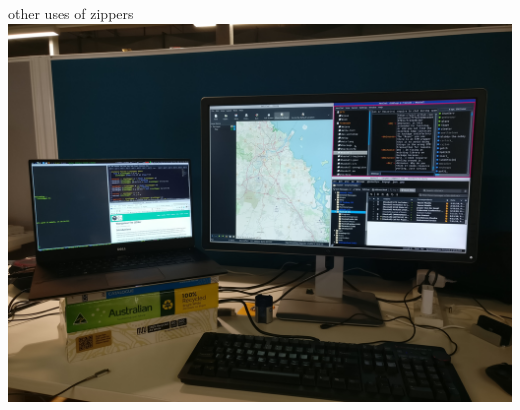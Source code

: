 
\begin{frame}
\begin{block}{other uses of zippers}
\includegraphics[width=1.00\textheight]{image/xmonad.jpg}
\end{block}
\end{frame}
